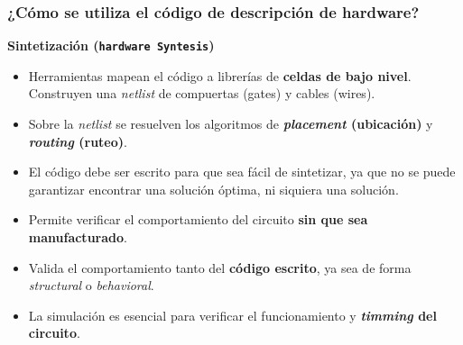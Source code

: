 \documentclass[aspectratio=169]{beamer}
\begin{document}
\begin{frame}[fragile,t]
\frametitle{¿Cómo se utiliza el código de descripción de hardware?}
    \textcolor{naranjauca}{\textbf{Sintetización (\texttt{hardware Syntesis})}}
    \begin{itemize}
    \item<1-> Herramientas mapean el código a librerías de \textbf{celdas de bajo nivel}.\\
    Construyen una \emph{netlist} de compuertas (gates) y cables (wires).
    \item<2-> Sobre la \emph{netlist} se resuelven los algoritmos de \textbf{\emph{placement} (ubicación)} y \textbf{\emph{routing} (ruteo)}.
    \item<3-> \textcolor{verdeuca}{El código debe ser escrito para que sea fácil de sintetizar, ya que no se puede garantizar encontrar una solución óptima, ni siquiera una solución.}
    \end{itemize}
    \begin{itemize}
    \item<4-> Permite verificar el comportamiento del circuito \textbf{sin que sea manufacturado}.
    \item<5-> Valida el comportamiento tanto del \textbf{código escrito}, ya sea de forma \emph{structural} o \emph{behavioral}.
    \item<6-> La simulación es esencial para verificar el funcionamiento y \textbf{\emph{timming} del circuito}.
    \end{itemize}


\end{frame}
\end{document}
